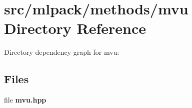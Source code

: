 \section{src/mlpack/methods/mvu Directory Reference}
\label{dir_50aae461fc54c04b83a55d9661813efb}
Directory dependency graph for mvu\-:
\subsection*{Files}
\begin{DoxyCompactItemize}
\item 
file {\bf mvu.\-hpp}
\end{DoxyCompactItemize}
